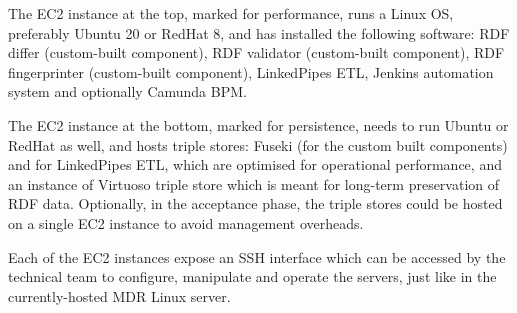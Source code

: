 	The EC2 instance at the top, marked for performance, runs a Linux OS, preferably Ubuntu 20 or RedHat 8, and has installed the following software: RDF differ (custom-built component), RDF validator (custom-built component), RDF fingerprinter (custom-built component), LinkedPipes ETL, Jenkins automation system and optionally Camunda BPM. 
	
	The EC2 instance at the bottom, marked for persistence, needs to run Ubuntu or RedHat as well, and hosts triple stores: Fuseki (for the custom built components) and for LinkedPipes ETL, which are optimised for operational performance, and an instance of Virtuoso triple store which is meant for long-term preservation of RDF data. 
	Optionally, in the acceptance phase, the triple stores could be hosted on a single EC2 instance to avoid management overheads. 
	
	Each of the EC2 instances expose an SSH interface which can be accessed by the technical team to configure, manipulate and operate the servers, just like in the currently-hosted MDR Linux server. 
	